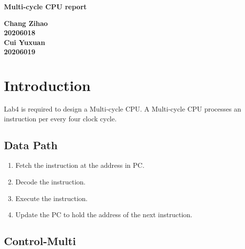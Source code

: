\documentclass[12pt,a4paper]{article}
\begin{document}
\begin{titlepage}
  \begin{center}
    \vspace*{1cm}

    \textbf{\Huge Multi-cycle CPU  report}

    \vspace{0.5cm}

         
    \vspace{1.5cm}

    \textbf{\large Chang Zihao \\20206018\\\large Cui Yuxuan\\20206019}

    \vfill
         

         
    \vspace{0.8cm}
  


         
\end{center}
\end{titlepage}


\newpage
\tableofcontents
\thispagestyle{empty}

\newpage
{}
\setcounter{page}{1}

\section{Introduction}

Lab4 is required to design a Multi-cycle CPU.
A Multi-cycle CPU processes an instruction per every four clock cycle.

\subsection{Data Path}

\begin{enumerate}
\item Fetch the instruction at the address in PC.
\item Decode the instruction.
\item Execute the instruction.
\item Update the PC to hold the address of the next instruction. 
\end{enumerate}

\subsection{Control-Multi}
\end{document}

